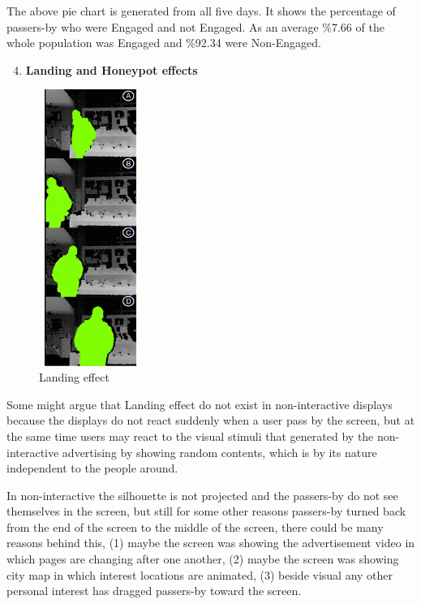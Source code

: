 \begin{enumerate}
The above pie chart is generated from all five days. It shows the percentage of passers-by who were Engaged and not Engaged. As an average \%7.66 of the whole population was Engaged and \%92.34 were Non-Engaged.


\end{enumerate}


\newpage
\begin{enumerate}
\setcounter{enumi}{3}
\item \textbf{Landing and Honeypot effects}
\end{enumerate}

\begin{figure}
  \vspace{-20pt}
  \begin{center}
    \includegraphics[width=0.30\textwidth,height=90mm]{figures/8/non_inter_findings/effects/landing}
  \end{center}
  \vspace{-20pt}
  \caption{Landing effect}
  \vspace{20pt}
\end{figure}
Some might argue that Landing\cite{EnticingPeople} effect do not exist in non-interactive displays because the displays do not react suddenly when a user pass by the screen, but at the same time users may react to the visual stimuli that generated by the non-interactive advertising by showing random contents, which is by its nature independent to the people around.

In non-interactive the silhouette is not projected and the passers-by do not see themselves in the screen, but still for some other reasons passers-by turned back from the end of the screen to the middle of the screen, there could be many reasons behind this, (1) maybe the screen was showing the advertisement video in which pages are changing after one another, (2) maybe the screen was showing city map in which interest locations are animated, (3) beside visual any other personal interest has dragged passers-by toward the screen. 

